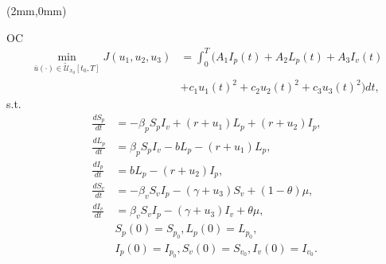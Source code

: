 	\begin{frame}[plain]
		\begin{textblock*}{120mm}(2mm,0mm)
			\begin{yellowbox}{OC}
				\begin{align*}
				\min_{\bar{u}(\cdot)\in \tilde{\mathcal{U}}_{x_0}[t_0,T]}J(u_1,u_2,u_3)&=
				\int_{0}^T	(A_1 I_p(t) + A_2 L_p(t) + A_3 I_v(t)
				\\
				&+ c_1 u_1(t)^2 + c_2 u_2(t)^2 + c_3 u_3(t)^2) dt,
				\end{align*}
				s.t.
				\begin{equation*}
					\begin{aligned}
						\frac{dS_p}{dt} &=
						 -\beta_p S_p I_v +(r +u_1)L_p + (r + u_2) I_p,
						 \\
						\frac{dL_p}{dt} &=
						\beta_p S_p I_v -b L_p -(r + u_1)L_p,
						\\
						\frac{dI_p}{dt} &= 
						b L_p - (r + u_2) I_p,
						\\
						\frac{dS_v}{dt} &=
						-\beta_v S_v I_p - (\gamma+u_3) S_v +(1-\theta)\mu,
						\\
						\frac{dI_v}{dt} &=
						\beta_v S_v I_p -(\gamma+u_3) I_v +\theta\mu,
						\\
						&S_p(0) = S_{p_0}, L_p(0) = L_{p_0},
						\\
						&I_p(0) = I_{p_0},S_v(0) = S_{v_0}, I_v(0) = I_{v_0}.
						\end{aligned}%
				\end{equation*}
			\end{yellowbox}
		\end{textblock*}
	\end{frame}
